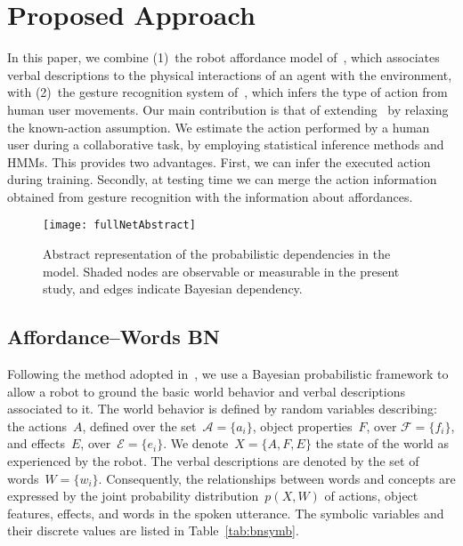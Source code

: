 
\section{Proposed Approach}


In this paper, we combine (1)~the robot affordance model of~\cite{salvi:2012:smcb}, which associates verbal descriptions to the physical interactions of an agent with the environment, with (2)~the gesture recognition system of~\cite{saponaro:2013:crhri}, which infers the type of action from human user movements. Our main contribution is that of extending~\cite{salvi:2012:smcb} by relaxing the known-action assumption. We estimate the action performed by a human user during a \hr{} collaborative task, by employing statistical inference methods and \acp{HMM}. This provides two advantages. First, we can infer the executed action during training. Secondly, at testing time we can merge the action information obtained from gesture recognition with the information about affordances.

\begin{figure}
  \centering
  \texttt{[image: fullNetAbstract]}
  \caption{Abstract representation of the probabilistic dependencies in the model. Shaded nodes are observable or measurable in the present study, and edges indicate Bayesian dependency.}
  \label{fig:model}
\end{figure}

\subsection{Affordance--Words \acl{BN}}
\label{sec:bn}

Following the method adopted in~\cite{salvi:2012:smcb}, we use a Bayesian probabilistic framework to allow a robot to ground the basic world behavior and verbal descriptions associated to it. The world behavior is defined by random variables describing: the actions~$A$, defined over the set~$\mathcal{A} = \{a_i\}$, object properties~$F$, over $\mathcal{F} = \{f_i\}$, and effects~$E$, over~$\mathcal{E} = \{e_i\}$. We denote~$X = \{A, F, E\}$ the state of the world as experienced by the robot. The verbal descriptions are denoted by the set of words~$W = \{w_i\}$. Consequently, the relationships between words and concepts are expressed by the joint probability distribution~$p(X,W)$ of actions, object features, effects, and words in the spoken utterance. The symbolic variables and their discrete values are listed in Table~\ref{tab:bnsymb}.


